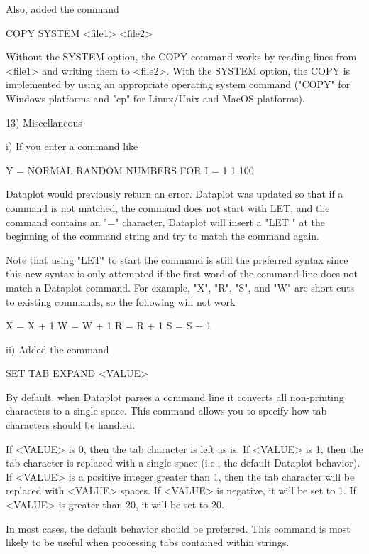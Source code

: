     Also, added the command

       COPY SYSTEM <file1> <file2>

    Without the SYSTEM option, the COPY command works by reading lines
    from <file1> and writing them to <file2>.  With the SYSTEM option,
    the COPY is implemented by using an appropriate operating system
    command ("COPY" for Windows platforms and "cp" for Linux/Unix and
    MacOS platforms).

13) Miscellaneous

      i) If you enter a command like

            Y = NORMAL RANDOM NUMBERS FOR I = 1 1 100

         Dataplot would previously return an error.  Dataplot was
         updated so that if a command is not matched, the command
         does not start with LET, and the command contains an
         "=" character, Dataplot will insert a "LET " at the
         beginning of the command string and try to match the command
         again.

         Note that using "LET" to start the command is still the
         preferred syntax since this new syntax is only attempted if
         the first word of the command line does not match a
         Dataplot command.  For example, "X", "R", "S", and "W"
         are short-cuts to existing commands, so the following
         will not work

             X = X + 1
             W = W + 1
             R = R + 1
             S = S + 1

     ii) Added the command

            SET TAB EXPAND <VALUE>

         By default, when Dataplot parses a command line it converts
         all non-printing characters to a single space.  This command
         allows you to specify how tab characters should be handled.

         If <VALUE> is 0, then the tab character is left as is.
         If <VALUE> is 1, then the tab character is replaced with
         a single space (i.e., the default Dataplot behavior).  If
         <VALUE> is a positive integer greater than 1, then the tab
         character will be replaced with <VALUE> spaces.  If <VALUE>
         is negative, it will be set to 1.  If <VALUE> is greater than
         20, it will be set to 20.

         In most cases, the default behavior should be preferred.  This
         command is most likely to be useful when processing tabs
         contained within strings.

